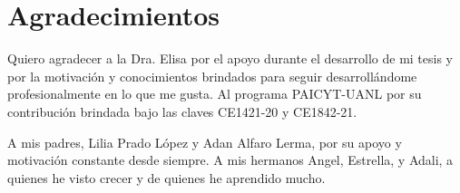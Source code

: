 
\chapter{Agradecimientos}

Quiero agradecer a la Dra. Elisa por el apoyo durante el desarrollo de mi tesis y por la motivación y conocimientos brindados para seguir desarrollándome profesionalmente en lo que me gusta. Al programa PAICYT-UANL por su contribución brindada bajo las claves CE1421-20 y CE1842-21. 

A mis padres, Lilia Prado López y Adan Alfaro Lerma, por su apoyo y motivación constante desde siempre. A mis hermanos Angel, Estrella, y Adali, a quienes he visto crecer y de quienes he aprendido mucho.
